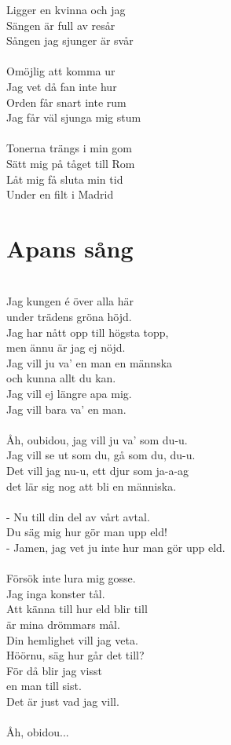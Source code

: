 Ligger en kvinna och jag\\
Sängen är full av resår\\
Sången jag sjunger är svår\\
\\
Omöjlig att komma ur\\
Jag vet då fan inte hur\\
Orden får snart inte rum\\
Jag får väl sjunga mig stum\\
\\
Tonerna trängs i min gom\\
Sätt mig på tåget till Rom\\
Låt mig få sluta min tid\\
Under en filt i Madrid

\newpage
\section{Apans sång}
\vspace{2mm}\\
Jag kungen é över alla här\\
under trädens gröna höjd.\\
Jag har nått opp till högsta topp,\\
men ännu är jag ej nöjd.\\
Jag vill ju va' en man en männska\\
och kunna allt du kan.\\
Jag vill ej längre apa mig.\\
Jag vill bara va' en man.\\
\\
Åh, oubidou, jag vill ju va' som du-u.\\
Jag vill se ut som du, gå som du, du-u.\\
Det vill jag nu-u, ett djur som ja-a-ag\\
det lär sig nog att bli en människa.\\
\\
- Nu till din del av vårt avtal.\\
Du säg mig hur gör man upp eld!\\
- Jamen, jag vet ju inte hur man gör upp eld.\\
\\
Försök inte lura mig gosse.\\
Jag inga konster tål.\\
Att känna till hur eld blir till\\
är mina drömmars mål.\\
Din hemlighet vill jag veta.\\
Höörnu, säg hur går det till?\\
För då blir jag visst\\
en man till sist.\\
Det är just vad jag vill.\\
\\
Åh, obidou...

